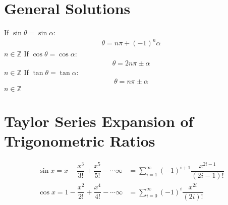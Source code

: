 \documentclass[../main.tex]{subfile}
\begin{document}
        \section{General Solutions}
        If $\sin \theta=\sin \alpha$:
        \begin{align}
        \theta=n\pi+(-1)^n\alpha
        \end{align}$n\in\mathbb{Z}$\newline
        If $\cos \theta=\cos \alpha$:
        \begin{align}
        \theta=2n\pi\pm\alpha
        \end{align}$n\in\mathbb{Z}$\newline
        If $\tan \theta=\tan \alpha$:
        \begin{align}
        \theta=n\pi\pm\alpha
        \end{align}$n\in\mathbb{Z}$
        
        \section{Taylor Series Expansion of Trigonometric Ratios}
        \begin{align}
            \sin x=x-\dfrac{x^3}{3!}+\dfrac{x^5}{5!}-\cdots\infty & = \sum_{i=1}^\infty (-1)^{i+1}\dfrac{x^{2i-1}}{(2i-1)!}\\
            \cos x=1-\dfrac{x^2}{2!}+\dfrac{x^4}{4!}-\cdots\infty & = \sum_{i=0}^\infty (-1)^i\dfrac{x^{2i}}{(2i)!}
        \end{align} 
    
\end{document}
